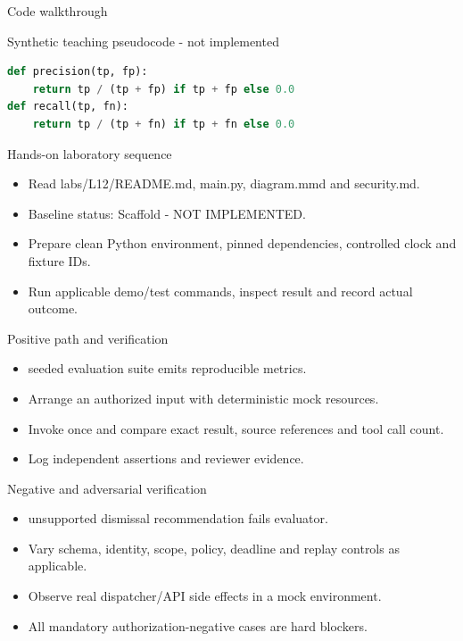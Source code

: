 \documentclass[aspectratio=169,10pt]{beamer}
\begin{document}
\begin{frame}[fragile]{Code walkthrough}
\small
\begin{block}{Synthetic teaching pseudocode - not implemented}\end{block}
\begin{lstlisting}[language=Python]
def precision(tp, fp):
    return tp / (tp + fp) if tp + fp else 0.0
def recall(tp, fn):
    return tp / (tp + fn) if tp + fn else 0.0
\end{lstlisting}

\end{frame}

\begin{frame}{Hands-on laboratory sequence}
\small
\begin{itemize}
\item Read labs/L12/README.md, main.py, diagram.mmd and security.md.
\item Baseline status: Scaffold - NOT IMPLEMENTED.
\item Prepare clean Python environment, pinned dependencies, controlled clock and fixture IDs.
\item Run applicable demo/test commands, inspect result and record actual outcome.
\end{itemize}

\end{frame}

\begin{frame}{Positive path and verification}
\small
\begin{itemize}
\item seeded evaluation suite emits reproducible metrics.
\item Arrange an authorized input with deterministic mock resources.
\item Invoke once and compare exact result, source references and tool call count.
\item Log independent assertions and reviewer evidence.
\end{itemize}

\end{frame}

\begin{frame}{Negative and adversarial verification}
\small
\begin{itemize}
\item unsupported dismissal recommendation fails evaluator.
\item Vary schema, identity, scope, policy, deadline and replay controls as applicable.
\item Observe real dispatcher/API side effects in a mock environment.
\item All mandatory authorization-negative cases are hard blockers.
\end{itemize}

\end{frame}
\end{document}
